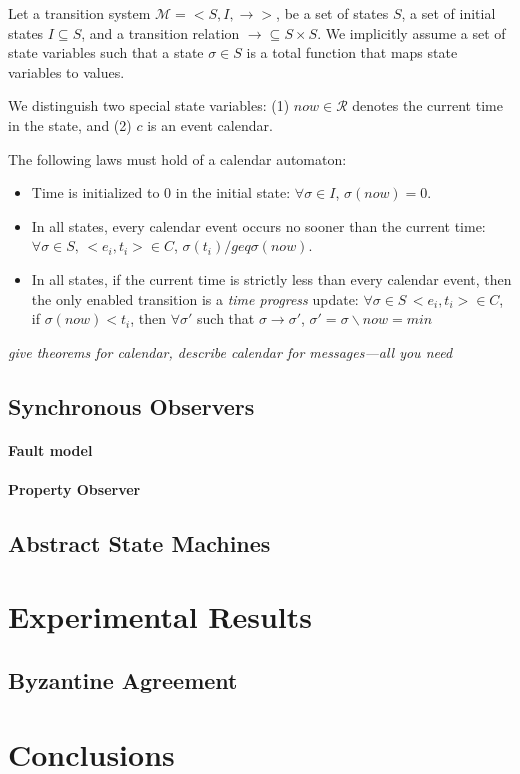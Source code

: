 \documentclass{IEEEtran/IEEEtran}
\begin{document}
Let a transition system $\mathcal{M} = <S, I, \rightarrow>$, be a set of states $S$, a set of initial states $I \subseteq S$, and a transition relation $\rightarrow \subseteq S \times S$. We implicitly assume a set of state variables such that a state $\sigma \in S$ is a total function that maps state variables to values.

We distinguish two special state variables: (1) $now \in \mathcal{R}$ denotes the current time in the state, and (2) $c$ is an event calendar.

The following laws must hold of a calendar automaton:

\begin{itemize}
\item Time is initialized to 0 in the initial state: $\forall \sigma \in I$, $\sigma(now) = 0$.
\item In all states, every calendar event occurs no sooner than the current time: $\forall \sigma \in S, \, <e_i, t_i> \in C$, $\sigma(t_i) /geq \sigma(now)$.
\item In all states, if the current time is strictly less than every calendar event, then the only enabled transition is a \emph{time progress} update: $\forall \sigma \in S \, <e_i, t_i> \in C$, if $\sigma(now) < t_i$, then $\forall \sigma'$ such that $\sigma \rightarrow \sigma'$, $\sigma' = \sigma \backslash now = min$
\end{itemize}

\emph{give theorems for calendar, describe calendar for messages---all you need}

\subsection{Synchronous Observers}\label{sec:sync}

\paragraph{Fault model}

\paragraph{Property Observer}

\subsection{Abstract State Machines}\label{sec:abstract}


\section{Experimental Results}\label{sec:experimental}

\subsection{Byzantine Agreement}\label{sec:byz}


\section{Conclusions}\label{sec:conclusions}
\end{document}
